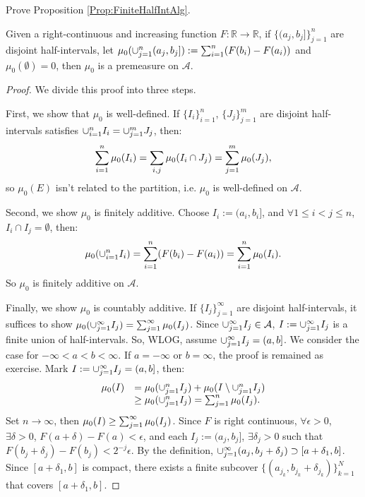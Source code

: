 \begin{exc}
    Prove Proposition \ref{Prop:FiniteHalfIntAlg}.
\end{exc}
\begin{lem}
    \label{Lem:PremeasureOnAlg}
    Given a right-continuous and increasing function 
    $F:\mathbb{R}\rightarrow\mathbb{R}$, if 
    $\{(a_j,b_j]\}_{j=1}^{n}$ are disjoint half-intervals, 
    let $\mu_0(\cup_{j=1}^{n}(a_j,b_j]):=\sum_{i=1}^{n}(F(b_i)-F(a_i))$ 
    and $\mu_{0}(\emptyset)=0$, then $\mu_0$ is a premeasure on 
    $\mathcal{A}$.
\end{lem}
\begin{proof}
    We divide this proof into three steps.

    First, we show that $\mu_{0}$ is well-defined. 
    If $\{I_i\}_{i=1}^{n}$, $\{J_{j}\}_{j=1}^{m}$ are disjoint 
    half-intervals satisfies $\cup_{i=1}^{n}I_i=\cup_{j=1}^{m}J_j$, 
    then:
    \begin{displaymath}
        \sum_{i=1}^{n}\mu_{0}(I_{i})
        =\sum_{i,j}\mu_{0}(I_i\cap J_j)
        =\sum_{j=1}^{m}\mu_{0}(J_j),
    \end{displaymath}
    so $\mu_0(E)$ isn't related to the partition, i.e. 
    $\mu_{0}$ is well-defined on $\mathcal{A}$. 

    Second, we show $\mu_{0}$ is finitely additive. 
    Choose $I_{i}:=(a_i,b_i]$, and $\forall 1\le i<j\le n$, 
    $I_i\cap I_j=\emptyset$, then:
    \begin{displaymath}
        \mu_{0}(\cup_{i=1}^{n}I_{i})
        =\sum_{i=1}^{n}(F(b_i)-F(a_i))
        =\sum_{i=1}^{n}\mu_{0}(I_i).
    \end{displaymath}
    So $\mu_{0}$ is finitely additive on $\mathcal{A}$.

    Finally, we show $\mu_{0}$ is countably additive. 
    If $\{I_{j}\}_{j=1}^{\infty}$ are disjoint half-intervals, 
    it suffices to show 
    $\mu_{0}(\cup_{j=1}^{\infty}I_j)=\sum_{j=1}^{\infty}\mu_{0}(I_j)$. 
    Since $\cup_{j=1}^{\infty}I_{j}\in\mathcal{A}$, 
    $I:=\cup_{j=1}^{\infty}I_{j}$ is a finite union of 
    half-intervals. 
    So, WLOG, assume $\cup_{j=1}^{\infty}I_j=(a,b]$. 
    We consider the case for $-\infty<a<b<\infty$. If 
    $a=-\infty$ or $b=\infty$, the proof is remained as exercise. 
    Mark $I:=\cup_{j=1}^{\infty}I_j=(a,b]$, then:
    \begin{displaymath}
        \begin{array}{rl}
        \mu_{0}(I)&=\mu_{0}(\cup_{j=1}^{n}I_j)+\mu_{0}(I\setminus\cup_{j=1}^{n}I_j)\\
        &\ge\mu_{0}(\cup_{j=1}^{n}I_j)=\sum_{j=1}^{n}\mu_{0}(I_j).
        \end{array}
    \end{displaymath}
    Set $n\rightarrow\infty$, then 
    $\mu_{0}(I)\ge\sum_{j=1}^{\infty}\mu_{0}(I_j)$. 
    Since $F$ is right continuous, $\forall\epsilon>0$, 
    $\exists\delta>0$, $F(a+\delta)-F(a)<\epsilon$, 
    and each $I_j:=(a_j,b_j]$, $\exists \delta_j>0$ such that 
    $F(b_j+\delta_j)-F(b_j)<2^{-j}\epsilon$. 
    By the definition, $\cup_{j=1}^{\infty}(a_j,b_j+\delta_j)
    \supset[a+\delta_1,b]$. Since $[a+\delta_1,b]$ is compact, 
    there exists a finite subcover 
    $\{(a_{j_{k}},b_{j_k}+\delta_{j_k})\}_{k=1}^{N}$ 
    that covers $[a+\delta_1,b]$. 


\end{proof}
